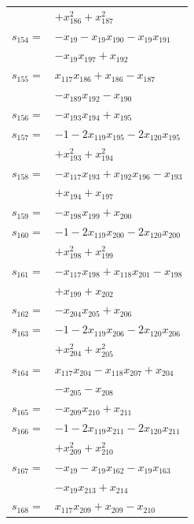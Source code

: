 \begin{longtable}{@{}r@{\;}l@{}}
 & \(\displaystyle +x_{186}^{2} +x_{187}^{2}\) \\[3pt]
\(s_{154}=\) & \(\displaystyle -x_{19} -x_{19}x_{190} -x_{19}x_{191}\) \\
 & \(\displaystyle -x_{19}x_{197} +x_{192}\) \\[3pt]
\(s_{155}=\) & \(\displaystyle x_{117}x_{186} +x_{186} -x_{187}\) \\
 & \(\displaystyle -x_{189}x_{192} -x_{190}\) \\[3pt]
\(s_{156}=\) & \(\displaystyle -x_{193}x_{194} +x_{195}\) \\[3pt]
\(s_{157}=\) & \(\displaystyle -1 -2x_{119}x_{195} -2x_{120}x_{195}\) \\
 & \(\displaystyle +x_{193}^{2} +x_{194}^{2}\) \\[3pt]
\(s_{158}=\) & \(\displaystyle -x_{117}x_{193} +x_{192}x_{196} -x_{193}\) \\
 & \(\displaystyle +x_{194} +x_{197}\) \\[3pt]
\(s_{159}=\) & \(\displaystyle -x_{198}x_{199} +x_{200}\) \\[3pt]
\(s_{160}=\) & \(\displaystyle -1 -2x_{119}x_{200} -2x_{120}x_{200}\) \\
 & \(\displaystyle +x_{198}^{2} +x_{199}^{2}\) \\[3pt]
\(s_{161}=\) & \(\displaystyle -x_{117}x_{198} +x_{118}x_{201} -x_{198}\) \\
 & \(\displaystyle +x_{199} +x_{202}\) \\[3pt]
\(s_{162}=\) & \(\displaystyle -x_{204}x_{205} +x_{206}\) \\[3pt]
\(s_{163}=\) & \(\displaystyle -1 -2x_{119}x_{206} -2x_{120}x_{206}\) \\
 & \(\displaystyle +x_{204}^{2} +x_{205}^{2}\) \\[3pt]
\(s_{164}=\) & \(\displaystyle x_{117}x_{204} -x_{118}x_{207} +x_{204}\) \\
 & \(\displaystyle -x_{205} -x_{208}\) \\[3pt]
\(s_{165}=\) & \(\displaystyle -x_{209}x_{210} +x_{211}\) \\[3pt]
\(s_{166}=\) & \(\displaystyle -1 -2x_{119}x_{211} -2x_{120}x_{211}\) \\
 & \(\displaystyle +x_{209}^{2} +x_{210}^{2}\) \\[3pt]
\(s_{167}=\) & \(\displaystyle -x_{19} -x_{19}x_{162} -x_{19}x_{163}\) \\
 & \(\displaystyle -x_{19}x_{213} +x_{214}\) \\[3pt]
\(s_{168}=\) & \(\displaystyle x_{117}x_{209} +x_{209} -x_{210}\) \\

\end{longtable}
